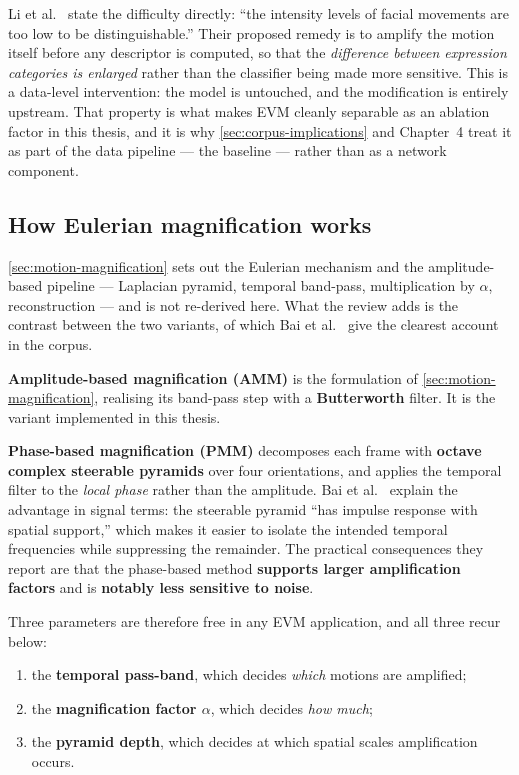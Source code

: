 Li et al.~\cite{liX2018} state the difficulty directly: ``the intensity levels of facial movements are too low to be distinguishable.'' Their proposed remedy is to amplify the motion itself before any descriptor is computed, so that the \textit{difference between expression categories is enlarged} rather than the classifier being made more sensitive. This is a data-level intervention: the model is untouched, and the modification is entirely upstream. That property is what makes EVM cleanly separable as an ablation factor in this thesis, and it is why \autoref{sec:corpus-implications} and Chapter~4 treat it as part of the data pipeline --- the baseline --- rather than as a network component.

\subsection{How Eulerian magnification works}
\label{sec:evm-how}

\autoref{sec:motion-magnification} sets out the Eulerian mechanism and the amplitude-based pipeline --- Laplacian pyramid, temporal band-pass, multiplication by $\alpha$, reconstruction --- and is not re-derived here. What the review adds is the contrast between the two variants, of which Bai et al.~\cite{bai2021} give the clearest account in the corpus.

\textbf{Amplitude-based magnification (AMM)} is the formulation of \autoref{sec:motion-magnification}, realising its band-pass step with a \textbf{Butterworth} filter. It is the variant implemented in this thesis.

\textbf{Phase-based magnification (PMM)} decomposes each frame with \textbf{octave complex steerable pyramids} over four orientations, and applies the temporal filter to the \textit{local phase} rather than the amplitude. Bai et al.~\cite{bai2021} explain the advantage in signal terms: the steerable pyramid ``has impulse response with spatial support,'' which makes it easier to isolate the intended temporal frequencies while suppressing the remainder. The practical consequences they report are that the phase-based method \textbf{supports larger amplification factors} and is \textbf{notably less sensitive to noise}.

Three parameters are therefore free in any EVM application, and all three recur below:

\begin{enumerate}
	\item the \textbf{temporal pass-band}, which decides \textit{which} motions are amplified;
	\item the \textbf{magnification factor $\alpha$}, which decides \textit{how much};
	\item the \textbf{pyramid depth}, which decides at which spatial scales amplification occurs.
\end{enumerate}

